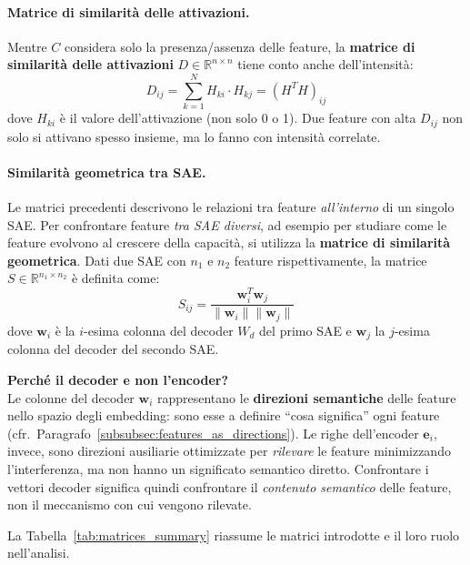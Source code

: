 \paragraph{Matrice di similarità delle attivazioni.} Mentre $C$ considera solo la presenza/assenza delle feature, la \textbf{matrice di similarità delle attivazioni} $D \in \mathbb{R}^{n \times n}$ tiene conto anche dell'intensità:
\begin{equation}
    D_{ij} = \sum_{k=1}^{N} H_{ki} \cdot H_{kj} = \left( H^T H \right)_{ij}
    \label{eq:activation_similarity}
\end{equation}
dove $H_{ki}$ è il valore dell'attivazione (non solo 0 o 1). Due feature con alta $D_{ij}$ non solo si attivano spesso insieme, ma lo fanno con intensità correlate.
\paragraph{Similarità geometrica tra SAE.} Le matrici precedenti descrivono le relazioni tra feature \textit{all'interno} di un singolo SAE. Per confrontare feature \textit{tra SAE diversi}, ad esempio per studiare come le feature evolvono al crescere della capacità, si utilizza la \textbf{matrice di similarità geometrica}.
Dati due SAE con $n_1$ e $n_2$ feature rispettivamente, la matrice $S \in \mathbb{R}^{n_1 \times n_2}$ è definita come:
\begin{equation}
    S_{ij} = \frac{\mathbf{w}_i^T \mathbf{w}_j}{\|\mathbf{w}_i\| \|\mathbf{w}_j\|}
    \label{eq:geometric_similarity}
\end{equation}
dove $\mathbf{w}_i$ è la $i$-esima colonna del decoder $W_d$ del primo SAE e $\mathbf{w}_j$ la $j$-esima colonna del decoder del secondo SAE.
\begin{notebox}
\textbf{Perché il decoder e non l'encoder?}\\[0.5em]
Le colonne del decoder $\mathbf{w}_i$ rappresentano le \textbf{direzioni semantiche} delle feature nello spazio degli embedding: sono esse a definire ``cosa significa'' ogni feature (cfr.\ Paragrafo~\ref{subsubsec:features_as_directions}). Le righe dell'encoder $\mathbf{e}_i$, invece, sono direzioni ausiliarie ottimizzate per \textit{rilevare} le feature minimizzando l'interferenza, ma non hanno un significato semantico diretto. Confrontare i vettori decoder significa quindi confrontare il \textit{contenuto semantico} delle feature, non il meccanismo con cui vengono rilevate.
\end{notebox}
La Tabella~\ref{tab:matrices_summary} riassume le matrici introdotte e il loro ruolo nell'analisi.
